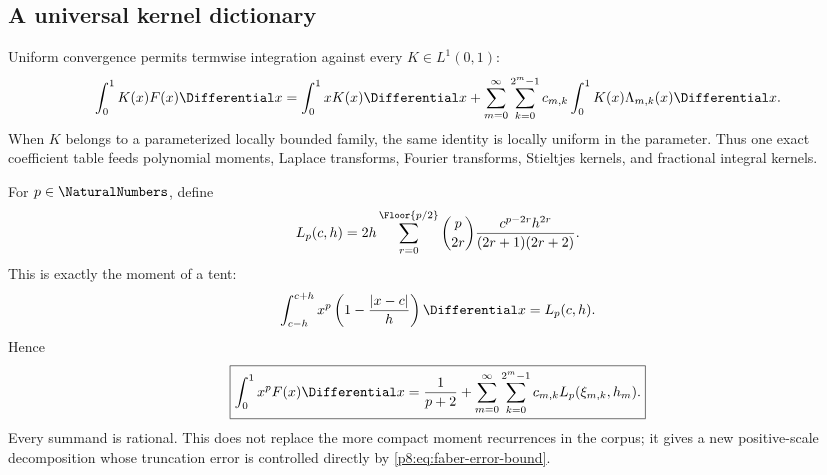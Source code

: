 \documentclass[11pt]{article}
\theoremstyle{definition}
\theoremstyle{remark}
\begin{document}
\subsection{A universal kernel dictionary}

Uniform convergence permits termwise integration against every
$K\in L^1(0,1)$:
\begin{equation}
 \int_0^1K(x)F(x)\Differential x
 =\int_0^1xK(x)\Differential x
 +\sum_{m=0}^\infty\sum_{k=0}^{2^m-1}
 c_{m,k}\int_0^1K(x)\Lambda_{m,k}(x)\Differential x.               \label{p8:eq:faber-kernel-dictionary}
\end{equation}
When $K$ belongs to a parameterized locally bounded family, the same identity
is locally uniform in the parameter.  Thus one exact coefficient table feeds
polynomial moments, Laplace transforms, Fourier transforms, Stieltjes
kernels, and fractional integral kernels.

For $p\in\NaturalNumbers$, define
\begin{equation}
 L_p(c,h)=2h\sum_{r=0}^{\Floor{p/2}}
 \binom{p}{2r}\frac{c^{p-2r}h^{2r}}{(2r+1)(2r+2)}.       \label{p8:eq:tent-moment}
\end{equation}
This is exactly the moment of a tent:
\begin{equation}
 \int_{c-h}^{c+h}x^p\left(1-\frac{|x-c|}{h}\right)\Differential x
 =L_p(c,h).                                              \label{p8:eq:tent-moment-integral}
\end{equation}
Hence
\begin{equation}
 \boxed{\displaystyle
 \int_0^1x^pF(x)\Differential x
 =\frac1{p+2}+
 \sum_{m=0}^\infty\sum_{k=0}^{2^m-1}
 c_{m,k}L_p(\xi_{m,k},h_m).}                             \label{p8:eq:faber-polynomial-moment}
\end{equation}
Every summand is rational.  This does not replace the more compact moment
recurrences in the corpus; it gives a new positive-scale decomposition whose
truncation error is controlled directly by \eqref{p8:eq:faber-error-bound}.
\end{document}
